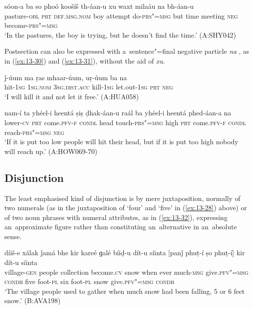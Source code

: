 \begin{exe}
\ex
\label{ex:13-29}
\gll sóon-a ba so phoó koošíš th-áan-u xu waxt milaáu na bh-áan-u \\
pasture-\textsc{obl} \textsc{prt} \textsc{def.msg.nom} boy attempt   do-\textsc{prs"=msg} but time meeting \textsc{neg} become-\textsc{prs"=msg} \\
\glt `In the pastures, the boy is trying, but he doesn't find the time.' (A:SHY042) 
\end{exe}

 Postsection can also be expressed with a~sentence"=final negative particle \textit{na} , as in (\ref{ex:13-30}) and (\ref{ex:13-31}), without the aid of \textit{xu}. 

\begin{exe}
\ex
\label{ex:13-30}
\gll ǰ-úum ma ṛas mhaar-úum, uṛ-úum ba na \\
hit-\textsc{1sg} \textsc{1sg.nom} \textsc{3sg.dist.acc} kill-\textsc{1sg} let.out-\textsc{1sg}
\textsc{prt} \textsc{neg} \\
\glt `I will kill it and not let it free.' (A:HUA058)

\ex
\label{ex:13-31}
\gll nam-í ta yhéel-i heentá ṣiṣ ḍhak-áan-u raál ba yhéel-i heentá phed-áan-a na \\
lower-\textsc{cv} \textsc{prt} come.\textsc{pfv-f} \textsc{condl} head touch-\textsc{prs"=msg}  high \textsc{prt} come.\textsc{pfv-f} \textsc{condl} reach-\textsc{prs"=msg} \textsc{neg} \\
\glt `If it is put too low people will hit their head, but if it is put too high nobody will reach up.' (A:HOW069-70)
\end{exe}

\subsection{Disjunction}
\label{subsec:13-2-3}

 The least emphasised kind of disjunction is by mere juxtaposition, normally of two numerals (as in the juxtaposition of `four' and `five' in (\ref{ex:13-28}) above) or of two noun phrases with numeral attributes, as in (\ref{ex:13-32}), expressing an~approximate figure rather than constituting an~alternative in an~absolute sense.

\begin{exe}
\ex
\label{ex:13-32}
\gll díiš-e xálak ǰamá bhe kir kareé ɡalé bíiḍ-u dít-u síinta [panǰ phuṭ-í ṣo phuṭ-í] kir dít-u síinta \\
village-\textsc{gen} people collection become.\textsc{cv} snow  when ever much-\textsc{msg} give.\textsc{pfv"=msg} \textsc{condh} five  foot-\textsc{pl} six foot-\textsc{pl} snow give.\textsc{pfv"=msg} \textsc{condh}  \\
\glt `The village people used to gather when much snow had been falling, 5 or 6 feet snow.' (B:AVA198) 
\end{exe}

